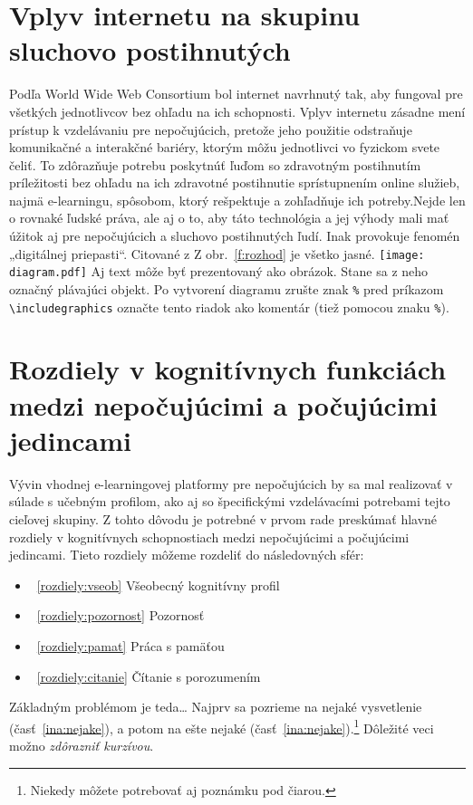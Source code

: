 \documentclass[10pt,twoside,slovak,a4paper]{article}
\begin{document}
\section{Vplyv internetu na skupinu sluchovo postihnutých} \label{vplyvinternetu}

\begin{figure*}[tbh]
\centering
Podľa World Wide Web Consortium bol internet navrhnutý tak, aby fungoval pre všetkých jednotlivcov bez ohľadu na ich schopnosti. Vplyv internetu zásadne mení prístup k vzdelávaniu pre nepočujúcich, pretože jeho použitie odstraňuje komunikačné a interakčné bariéry, ktorým môžu jednotlivci vo fyzickom svete čeliť. To zdôrazňuje potrebu poskytnúť ľuďom so zdravotným postihnutím príležitosti bez ohľadu na ich zdravotné postihnutie sprístupnením online služieb, najmä e-learningu, spôsobom, ktorý rešpektuje a zohľadňuje ich potreby.Nejde len o rovnaké ľudské práva, ale aj o to, aby táto technológia a jej výhody mali mať úžitok aj pre nepočujúcich a sluchovo postihnutých ľudí. Inak provokuje fenomén „digitálnej priepasti“.\linebreak
Citované z \cite{pappas2018learning}
Z obr.~\ref{f:rozhod} je všetko jasné. 
\texttt{[image: diagram.pdf]}
Aj text môže byť prezentovaný ako obrázok. Stane sa z neho označný plávajúci objekt. Po vytvorení diagramu zrušte znak \texttt{\%} pred príkazom \verb|\includegraphics| označte tento riadok ako komentár (tiež pomocou znaku \texttt{\%}).
\caption{Rozhodujúci argument.}
\label{f:rozhod}
\end{figure*}



\section{Rozdiely v kognitívnych funkciách medzi nepočujúcimi a počujúcimi jedincami} \label{rozdiely}
Vývin vhodnej e-learningovej platformy pre nepočujúcich by sa mal realizovať v súlade s učebným profilom, ako aj so špecifickými vzdelávacími potrebami  tejto cieľovej skupiny. Z tohto dôvodu je potrebné v prvom rade preskúmať hlavné rozdiely v kognitívnych schopnostiach medzi nepočujúcimi a počujúcimi jedincami.\linebreak
Tieto rozdiely môžeme rozdeliť do následovných sfér:
\begin{itemize}
\item ~\ref{rozdiely:vseob} Všeobecný kognitívny profil
\item ~\ref{rozdiely:pozornost} Pozornosť
\item ~\ref{rozdiely:pamat} Práca s pamäťou
\item ~\ref{rozdiely:citanie} Čítanie s porozumením
\end{itemize}
Základným problémom je teda\ldots{} Najprv sa pozrieme na nejaké vysvetlenie (časť~\ref{ina:nejake}), a potom na ešte nejaké (časť~\ref{ina:nejake}).\footnote{Niekedy môžete potrebovať aj poznámku pod čiarou.}
Dôležité veci možno \emph{zdôrazniť kurzívou}.
\end{document}
